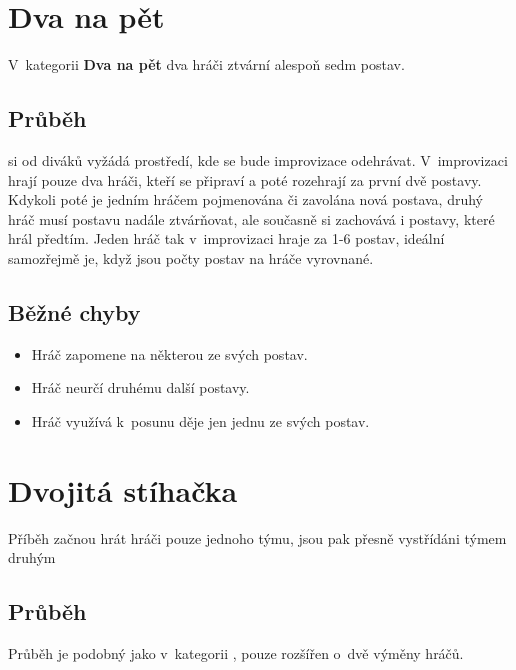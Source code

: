  
\needspace{5cm} \section{Dva na pět} \label{dva na pět}  
 
V~kategorii \textbf{Dva na pět} dva hráči ztvární alespoň sedm postav. 
 
\subsection{Průběh}  si od diváků vyžádá prostředí, kde se bude improvizace odehrávat. V~improvizaci hrají pouze dva hráči, kteří se připraví a poté rozehrají za první dvě postavy. Kdykoli poté je jedním hráčem pojmenována či zavolána nová postava, druhý hráč musí postavu nadále ztvárňovat, ale současně si zachovává i postavy, které hrál předtím. Jeden hráč tak v~improvizaci hraje za 1-6 postav, ideální samozřejmě je, když jsou počty postav na hráče vyrovnané. 
 
\subsection{ Běžné chyby } \begin{itemize}
\item  Hráč zapomene na některou ze svých postav.
\item  Hráč neurčí druhému další postavy.
\item  Hráč využívá k~posunu děje jen jednu ze svých postav.
\end{itemize}
 
 
 
 
 
 
 
 
\needspace{5cm} \section{Dvojitá stíhačka} \label{dvojitá stíhačka}  
 
Příběh začnou hrát hráči pouze jednoho týmu, jsou pak přesně vystřídáni týmem druhým  
 
\subsection{ Průběh } Průběh je podobný jako v~kategorii , pouze rozšířen o~dvě výměny hráčů. 
 
